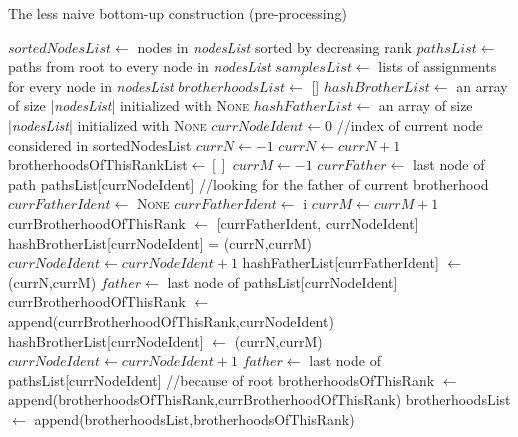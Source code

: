\documentclass{report}
\begin{document}
\begin{algorithm}
\caption{The less naive bottom-up construction (pre-processing)}
\begin{algorithmic}
\STATE $sortedNodesList \leftarrow$ nodes in \emph{nodesList} sorted by decreasing rank
\STATE $pathsList \leftarrow$ paths from root to every node in \emph{nodesList}
\STATE $samplesList \leftarrow$ lists of assignments for every node in \emph{nodesList}
\STATE $brotherhoodsList \leftarrow$ []
\STATE $hashBrotherList \leftarrow$ an array of size |\emph{nodesList}| initialized with \textsc{None}
\STATE $hashFatherList \leftarrow$ an array of size |\emph{nodesList}| initialized with \textsc{None}
\STATE $currNodeIdent \leftarrow 0$ //index of current node considered in sortedNodesList
\STATE $currN \leftarrow -1$
\STATE $currN \leftarrow currN + 1$
\STATE brotherhoodsOfThisRankList$ \leftarrow []$
\STATE $currM \leftarrow -1$
\STATE $currFather \leftarrow$ last node of path pathsList[currNodeIdent] //looking for the father of current brotherhood
\STATE $currFatherIdent \leftarrow$ \textsc{None}
\STATE $currFatherIdent \leftarrow$ i
\ENDIF
\ENDFOR
\STATE $currM \leftarrow currM + 1$
\STATE currBrotherhoodOfThisRank $\leftarrow$ [currFatherIdent, currNodeIdent] 
\STATE hashBrotherList[currNodeIdent] = (currN,currM)
\STATE $currNodeIdent \leftarrow currNodeIdent + 1$
\STATE hashFatherList[currFatherIdent] $\leftarrow$ (currN,currM)
\STATE $father \leftarrow $ last node of pathsList[currNodeIdent]
\ENDIF
{}
\STATE currBrotherhoodOfThisRank $\leftarrow$ append(currBrotherhoodOfThisRank,currNodeIdent)
\STATE hashBrotherList[currNodeIdent] $\leftarrow$ (currN,currM)
\ENDIF
\STATE $currNodeIdent \leftarrow currNodeIdent + 1$
\STATE $father \leftarrow $ last node of pathsList[currNodeIdent] //because of root
\ENDIF
\STATE brotherhoodsOfThisRank $\leftarrow$ append(brotherhoodsOfThisRank,currBrotherhoodOfThisRank)
\ENDWHILE
{}
\STATE brotherhoodsList $\leftarrow$ append(brotherhoodsList,brotherhoodsOfThisRank)
\ENDIF
\ENDWHILE
\ENDFOR
{}
\end{algorithmic}
\end{algorithm}
\end{document}
